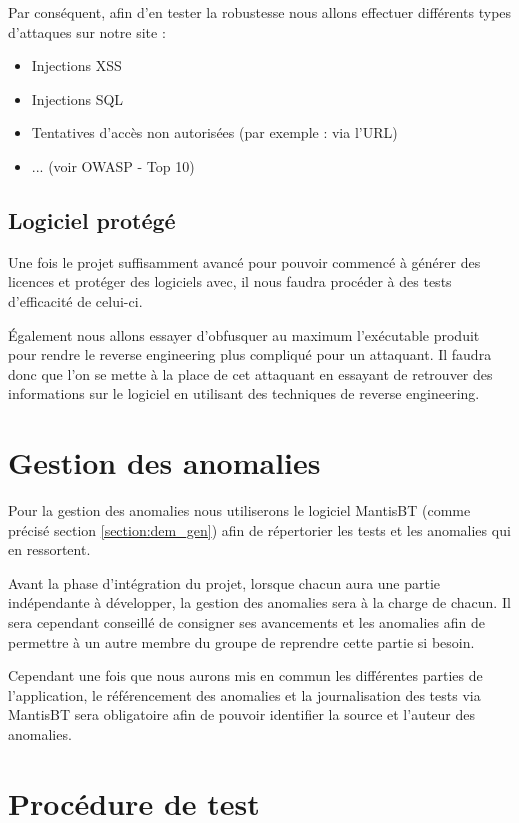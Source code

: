 Par conséquent, afin d'en tester la robustesse nous allons effectuer différents types d'attaques sur notre site :
\begin{itemize}
    \item Injections XSS
    \item Injections SQL
    \item Tentatives d'accès non autorisées (par exemple : via l'URL)
    \item ... (voir OWASP - Top 10)
\end{itemize}


\section{Logiciel protégé}

Une fois le projet suffisamment avancé pour pouvoir commencé à générer des licences et protéger des logiciels
avec, il nous faudra procéder à des tests d'efficacité de celui-ci.

Également nous allons essayer d'obfusquer au maximum l'exécutable produit pour rendre le reverse engineering
plus compliqué pour un attaquant. Il faudra donc que l'on se mette à la place de cet attaquant en essayant
de retrouver des informations sur le logiciel en utilisant des techniques de reverse engineering.


\chapter{Gestion des anomalies}
Pour la gestion des anomalies nous utiliserons le logiciel MantisBT (comme précisé section
\ref{section:dem_gen}) afin de répertorier les tests et les anomalies qui en ressortent.\newline

Avant la phase d'intégration du projet, lorsque chacun aura une partie indépendante à développer,
la gestion des anomalies sera à la charge de chacun. Il sera cependant conseillé de consigner ses
avancements et les anomalies afin de permettre à un autre membre du groupe de reprendre cette
partie si besoin.\newline

Cependant une fois que nous aurons mis en commun les différentes parties de l'application, le
référencement des anomalies et la journalisation des tests via MantisBT sera obligatoire afin de
pouvoir identifier la source et l'auteur des anomalies.


\chapter{Procédure de test}

